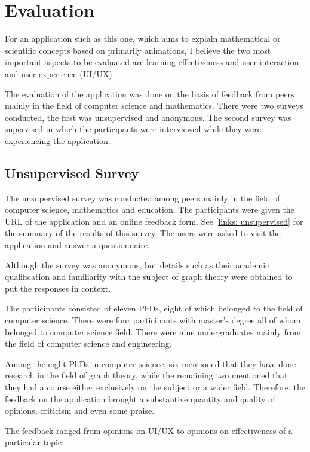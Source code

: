 
\section{Evaluation}

For an application such as this one, which aims to explain mathematical or
scientific concepts based on primarily animations, I believe the two most important aspects to be evaluated are learning effectiveness and user interaction and user
experience (UI/UX).


The evaluation of the application was done on the basis of feedback from peers
mainly in the field of computer science and mathematics. There were two surveys
conducted, the first was unsupervised and anonymous. The second survey was
supervised in which the participants were interviewed while they were
experiencing the application.

\subsection{Unsupervised Survey}
The unsupervised survey was conducted among peers mainly in the field of
computer science, mathematics and education. The participants were given the
URL of the application and an online feedback form. See \autoref{links:
unsupervised} for the summary of the results of this survey. The users were asked to visit the application
and answer a questionnaire.

Although the survey was anonymous, but details such as their academic qualification and familiarity with
the subject of graph theory were obtained to put the responses in context.

The participants consisted of eleven PhDs, eight of which belonged to the field
of computer science. There were four participants with master's degree all of
whom belonged to computer science field. There were nine undergraduates mainly
from the field of computer science and engineering.

Among the eight PhDs in computer science, six mentioned that they have done
research in the field of graph theory, while the remaining two mentioned that
they had a course either exclusively on the subject or a wider field.
Therefore, the feedback on the application brought a substantive quantity and
quality of opinions, criticism and even some praise.

The feedback ranged from opinions on UI/UX to 
opinions on effectiveness of a particular topic.


